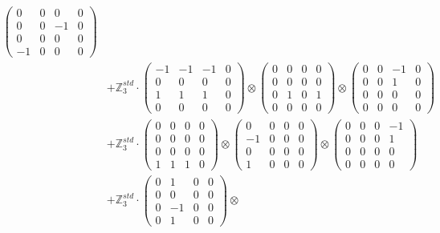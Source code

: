 \documentclass{article}
\begin{document}
{\begin{align}
            \begin{pmatrix} 0 & 0 & 0 & 0 \\ 0 & 0 & -1 & 0 \\ 0 & 0 & 0 & 0 \\ -1 & 0 & 0 & 0 \end{pmatrix} \\ 
        &+ \label{Rs16-Rc11-Solution-3-c25} \mathbb{Z}_3^{std} \cdot 
            \begin{pmatrix} -1 & -1 & -1 & 0 \\ 0 & 0 & 0 & 0 \\ 1 & 1 & 1 & 0 \\ 0 & 0 & 0 & 0 \end{pmatrix} \otimes 
            \begin{pmatrix} 0 & 0 & 0 & 0 \\ 0 & 0 & 0 & 0 \\ 0 & 1 & 0 & 1 \\ 0 & 0 & 0 & 0 \end{pmatrix} \otimes 
            \begin{pmatrix} 0 & 0 & -1 & 0 \\ 0 & 0 & 1 & 0 \\ 0 & 0 & 0 & 0 \\ 0 & 0 & 0 & 0 \end{pmatrix} \\ 
        &+ \label{Rs16-Rc11-Solution-3-c26} \mathbb{Z}_3^{std} \cdot 
            \begin{pmatrix} 0 & 0 & 0 & 0 \\ 0 & 0 & 0 & 0 \\ 0 & 0 & 0 & 0 \\ 1 & 1 & 1 & 0 \end{pmatrix} \otimes 
            \begin{pmatrix} 0 & 0 & 0 & 0 \\ -1 & 0 & 0 & 0 \\ 0 & 0 & 0 & 0 \\ 1 & 0 & 0 & 0 \end{pmatrix} \otimes 
            \begin{pmatrix} 0 & 0 & 0 & -1 \\ 0 & 0 & 0 & 1 \\ 0 & 0 & 0 & 0 \\ 0 & 0 & 0 & 0 \end{pmatrix} \\ 
        &+ \label{Rs16-Rc11-Solution-3-c27} \mathbb{Z}_3^{std} \cdot 
            \begin{pmatrix} 0 & 1 & 0 & 0 \\ 0 & 0 & 0 & 0 \\ 0 & -1 & 0 & 0 \\ 0 & 1 & 0 & 0 \end{pmatrix} \otimes 

\end{align}}
\end{document}
